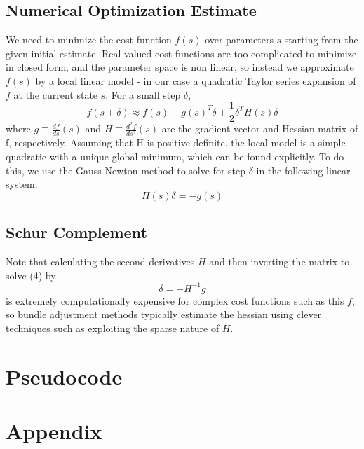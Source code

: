 \subsection{Numerical Optimization Estimate}
We need to minimize the cost function $f(s)$ over parameters $s$ starting from the given initial
estimate. Real valued cost functions are too complicated to minimize in closed form, and the
parameter space is non linear, so instead we approximate $f(s)$ by a local linear model - in our
case a quadratic Taylor series expansion of $f$ at the current state $s$. For a small step
$\delta$,
\begin{equation}
  f(s + \delta) \approx f(s) + g(s)^T \delta + \frac{1}{2} \delta^T H(s) \delta
\end{equation}
where $g \equiv \frac{df}{ds}(s)$ and $H \equiv \frac{d^2f}{ds^2}(s)$ are the gradient vector
and Hessian matrix of f, respectively. Assuming that H is positive definite, the local model is
a simple quadratic with a unique global minimum, which can be found explicitly. To do this, we
use the Gauss-Newton method to solve for step $\delta$ in the following linear system.
\begin{equation}
  H(s) \delta = -g(s)
\end{equation}

\subsection{Schur Complement}
Note that calculating the second derivatives $H$ and then inverting the matrix to solve (4) by
$$ \delta = -H^{-1} g $$
is extremely computationally expensive for complex cost functions such as this $f$, so bundle
adjustment methods typically estimate the hessian using clever techniques such as exploiting
the sparse nature of $H$.

\section{Pseudocode}

\section{Appendix}


